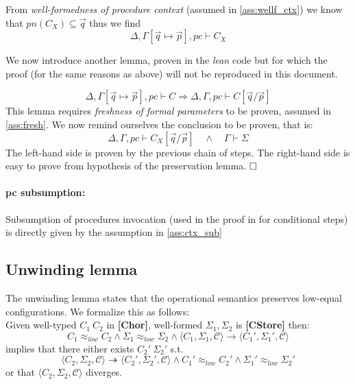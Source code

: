 \documentclass[12pt,a4paper,twoside]{book}
\newcommand{\qed}{\hfill\square}
\begin{document}
From \emph{well-formedness of procedure context} (assumed in \ref{ass:wellf_ctx})
we know that $pn(C_X) \subseteq \vec{q}$ thus we find
$$
\Delta,\Gamma[\vec{q}\mapsto\vec{p}],pc \vdash C_X
$$

We now introduce another lemma, proven in the \emph{lean} code but for which the proof (for the same reasons as above) will not be reproduced in this document.

\begin{equation*}\label{aux:pres_lemma1}
\Delta, \Gamma[\vec{q}\mapsto\vec{p}], pc \vdash C \Rightarrow
\Delta, \Gamma, pc \vdash C[\vec{q}/\vec{p}]
\end{equation*}
This lemma requires \emph{freshness of formal parameters} to be proven, assumed in \ref{ass:fresh}.
We now remind ourselves the conclusion to be proven, that is:
$$
\Delta, \Gamma, pc \vdash C_X[\vec{q}/\vec{p}]\quad\land\quad \Gamma \vdash \Sigma
$$
The left-hand side is proven by the previous chain of steps.
The right-hand side is easy to prove from hypothesis of the preservation lemma.
$\qed$

\paragraph{pc subsumption:}
Subsumption of procedures invocation (used in the proof in \cite{myers2011proving} for conditional steps) is directly given by the assumption in \ref{ass:ctx_sub}

\subsection{Unwinding lemma}
The unwinding lemma states that the operational semantics preserves low-equal configurations. We formalize this as follows:\\
Given well-typed $C_1~C_2$ in \textbf{[Chor]}, well-formed $\Sigma_1, \Sigma_2$ is \textbf{[CStore]} then:
$$
C_1 \approx_{low} C_2 \land
\Sigma_1 \approx_{low} \Sigma_2 \land
\langle C_1, \Sigma_1, \mathscr{C} \rangle \rightarrow
\langle C_1', \Sigma_1', \mathscr{C} \rangle
$$
implies that there either exists $C_2'~\Sigma_2'$ s.t.
\begin{equation}\label{aux:unw}
\langle C_2, \Sigma_2, \mathscr{C} \rangle \twoheadrightarrow
\langle C_2', \Sigma_2', \mathscr{C} \rangle
\land C_1' \approx_{low} C_2'
\land \Sigma_1' \approx_{low} \Sigma_2'
\end{equation}
or that $\langle C_2, \Sigma_2, \mathscr{C}\rangle$ diverges.
\end{document}
